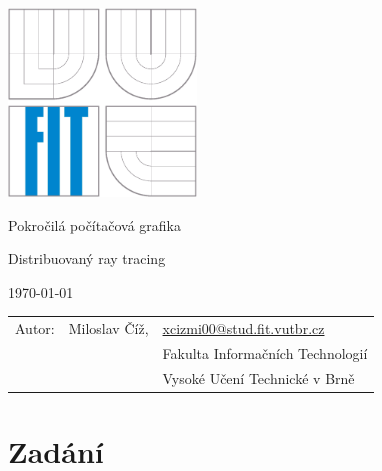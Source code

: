 \documentclass[12pt,a4paper,titlepage,final]{report}
\makeatletter
\newcommand\Course{Pokročilá počítačová grafika}
\newcommand\WorkTitle{Distribuovaný ray tracing}
\newcommand\Author{Miloslav Číž}
\newcommand\AuthorEmail{xcizmi00@stud.fit.vutbr.cz}
\newcommand\Faculty{Fakulta Informačních Technologií}
\newcommand\School{Vysoké Učení Technické v Brně}
\makeatother
\begin{document}
    \begin{titlepage}
    \begin{center}
        \includegraphics[height=5cm]{images/logo.eps}
    \end{center}
    \vfill
    \begin{center}
        \begin{Large}
            \Course\\
        \end{Large}
        \bigskip
        \begin{Huge}
            \WorkTitle\\
        \end{Huge}
    \end{center}
    \vfill
    \begin{center}
        \begin{large}
            \today
        \end{large}
    \end{center}
    \vfill
    \begin{flushleft}
        \begin{large}
            \begin{tabular}{lll}
                Autor: & \Author, & \url{\AuthorEmail} \\
                & & \Faculty \\
                & & \School \\
            \end{tabular}
        \end{large}
    \end{flushleft}
\end{titlepage}


\tableofcontents

\newpage
\chapter{Zadání}
\end{document}
